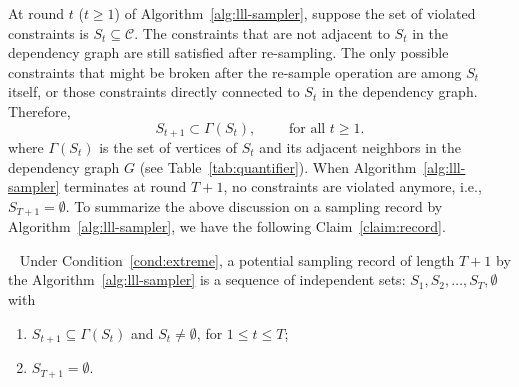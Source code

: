 At round $t$ ($t \geq 1$) of Algorithm~\ref{alg:lll-sampler}, suppose the
set of violated constraints is $S_t\subseteq \mathcal{C}$. The constraints that are
not adjacent to $S_t$ in the dependency graph are still satisfied after
re-sampling. The only possible constraints that might be broken after the
re-sample operation are among $S_t$ itself, or those constraints directly
connected to $S_t$ in the dependency graph. Therefore,
\begin{equation*}
    S_{t+1} \subset \Gamma(S_t),    \qquad \text{ for all } t\ge 1.
\end{equation*}
where $\Gamma(S_t)$ is the set of vertices of $S_t$ and its adjacent neighbors
in the dependency graph $G$ (see Table~\ref{tab:quantifier}).  When Algorithm~\ref{alg:lll-sampler} terminates at round $T+1$, no  constraints are violated anymore, i.e., $S_{T+1}=\emptyset$.  To summarize the above discussion on a sampling record by Algorithm~\ref{alg:lll-sampler}, we have the following Claim~\ref{claim:record}.
\begin{claim}~\label{claim:record}
    Under Condition~\ref{cond:extreme}, a potential sampling record of length $T+1$ by the Algorithm~\ref{alg:lll-sampler} is a sequence of independent sets: $S_1, S_2, \ldots,S_T,\emptyset$ with
    \begin{enumerate}
        \item $S_{t+1} \subseteq \Gamma(S_{t})$ and $S_t\neq\emptyset$, for $1 \leq t\leq T$;
        \item $S_{T+1}=\emptyset$.
    \end{enumerate}
\end{claim}

